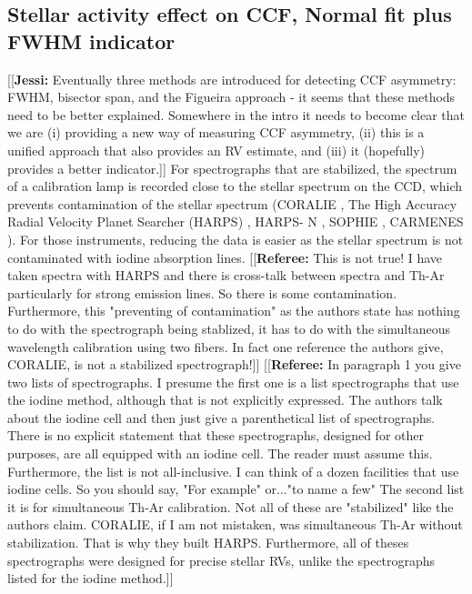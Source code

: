 \documentclass[11pt, oneside]{article}
\newcommand{\jessi}[1]{{\color{Purple}[[\textbf{Jessi: }#1]]}}
\newcommand{\comment}[1]{{\color{red}[[\textbf{Referee: }#1]]}}
\begin{document}
\subsection{Stellar activity effect on CCF, Normal fit plus FWHM indicator}
\jessi{Eventually three methods are introduced for detecting CCF asymmetry:  FWHM, bisector span, and the Figueira approach - it seems that these methods need to be better explained.  Somewhere in the intro it needs to become clear that we are (i) providing a new way of measuring CCF asymmetry, (ii) this is a unified approach that also provides an RV estimate, and (iii) it (hopefully) provides a better indicator.}
For spectrographs that are stabilized, the spectrum of a calibration lamp is recorded close to the stellar spectrum on the CCD, which prevents contamination of the stellar spectrum (CORALIE \citep{Queloz-2000a}, The High Accuracy Radial Velocity Planet Searcher (HARPS) \citep{Mayor-2003}, HARPS- N \citep{Cosentino-2012}, SOPHIE \citep{Bouchy:2013aa}, CARMENES \citep{Quirrenbach:2014aa}). For those instruments, reducing the data is easier as the stellar spectrum is not contaminated with iodine absorption lines.
\comment{This is not true! I have taken spectra with HARPS and there is cross-talk between spectra and Th-Ar particularly for strong emission lines. So there is some contamination. Furthermore, this "preventing of contamination" as the authors state has nothing to do with the spectrograph being stablized, it has to do with the simultaneous wavelength calibration using two fibers. In fact one reference the authors give, CORALIE, is not a stabilized spectrograph!}
\comment{In paragraph 1 you give two lists of spectrographs. I presume the first one is a list spectrographs that use the iodine method, although that is not explicitly expressed. The authors talk about the iodine cell and then just give a parenthetical list of spectrographs. There is no explicit statement that these spectrographs, designed for other purposes, are all equipped with an iodine cell. The reader must assume this. Furthermore, the list is not all-inclusive. I can think of a dozen facilities that use iodine cells. So you should say, "For example" or..."to name a few"
The second list it is for simultaneous Th-Ar calibration. Not all of these are "stabilized" like the authors claim. CORALIE, if I am not mistaken, was simultaneous Th-Ar without stabilization. That is why they built HARPS. Furthermore, all of theses spectrographs were designed for precise stellar RVs, unlike the spectrographs listed for the iodine method.}
\end{document}
